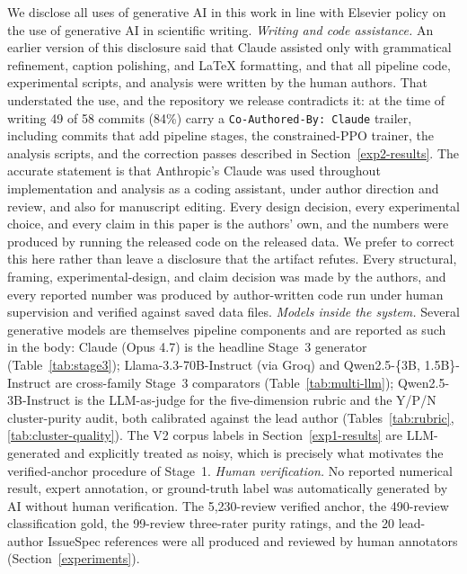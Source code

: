 \documentclass[preprint,12pt]{elsarticle}
\begin{document}
We disclose all uses of generative AI in this work in line with Elsevier policy on the use of generative AI in scientific writing. \emph{Writing and code assistance.} An earlier version of this disclosure said that Claude
assisted only with grammatical refinement, caption polishing, and LaTeX formatting, and that all
pipeline code, experimental scripts, and analysis were written by the human authors. That
understated the use, and the repository we release contradicts it: at the time of writing 49 of 58 commits (84\%) carry a
\texttt{Co-Authored-By: Claude} trailer, including commits that add pipeline stages, the
constrained-PPO trainer, the analysis scripts, and the correction passes described in
Section~\ref{exp2-results}. The accurate statement is that Anthropic's Claude was used
throughout implementation and analysis as a coding assistant, under author direction and review,
and also for manuscript editing. Every design decision, every experimental choice, and every
claim in this paper is the authors' own, and the numbers were produced by running the released
code on the released data. We prefer to correct this here rather than leave a disclosure that
the artifact refutes. Every structural, framing, experimental-design, and claim decision was made by the authors, and every reported number was produced by author-written code run under human supervision and verified against saved data files. \emph{Models inside the system.} Several generative models are themselves pipeline components and are reported as such in the body: Claude (Opus 4.7) is the headline Stage~3 generator (Table~\ref{tab:stage3}); Llama-3.3-70B-Instruct (via Groq) and Qwen2.5-\{3B, 1.5B\}-Instruct are cross-family Stage~3 comparators (Table~\ref{tab:multi-llm}); Qwen2.5-3B-Instruct is the LLM-as-judge for the five-dimension rubric and the Y/P/N cluster-purity audit, both calibrated against the lead author (Tables~\ref{tab:rubric}, \ref{tab:cluster-quality}). The V2 corpus labels in Section~\ref{exp1-results} are LLM-generated and explicitly treated as
   noisy, which is precisely what motivates the verified-anchor procedure of Stage~1. \emph{Human verification.} No reported numerical result, expert annotation, or ground-truth label was automatically generated by AI without human verification. The 5{,}230-review verified anchor, the 490-review classification gold, the 99-review three-rater purity ratings, and the 20 lead-author IssueSpec references were all produced and reviewed by human annotators (Section~\ref{experiments}).

\end{document}
